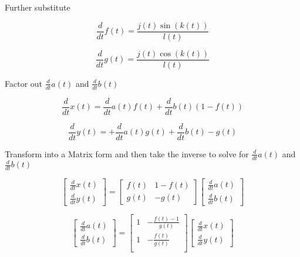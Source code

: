 \documentclass{article}
\begin{document}
Further substitute

\[
    \frac{d}{d t} f{(t )} = \frac{j(t) \sin({k(t)})}{l(t)}
\]

\[
    \frac{d}{d t} g{(t )} = \frac{j(t) \cos({k(t)})}{l(t)}
\]

Factor out $ \frac{d}{d t} a{(t )} $ and $ \frac{d}{d t} b{(t )} $

\[
    \frac{d}{d t} x{(t )} =  \frac{d}{d t} a{(t )} f(t) + \frac{d}{d t} b{(t )} ( 1 - f(t))
\]

\[
    \frac{d}{d t} y{(t )} =  + \frac{d}{d t} a{(t )} g(t) + \frac{d}{d t} b{(t )}  - g(t)
\]

Transform into a Matrix form and then take the inverse to solve for $ \frac{d}{d t} a{(t )} $ and $ \frac{d}{d t} b{(t )} $

\[
    \begin{bmatrix}
    \frac{d}{d t} x{(t )} \\ 
    \frac{d}{d t} y{(t )}
    \end{bmatrix}
    =
    \begin{bmatrix}
    f(t) & 1-f(t) \\ 
    g(t) & -g(t)
    \end{bmatrix}
    \begin{bmatrix}
    \frac{d}{d t} a{(t )} \\ 
    \frac{d}{d t} b{(t )}
    \end{bmatrix}
\]



\[
    \begin{bmatrix}
    \frac{d}{d t} a{(t )} \\ 
    \frac{d}{d t} b{(t )}
    \end{bmatrix}
    =
    \begin{bmatrix}
    1 & -\frac{f(t)-1}{g(t)} \\
    1 & -\frac{f(t)}{g(t)} \\
    \end{bmatrix}
    \begin{bmatrix}
    \frac{d}{d t} x{(t )} \\ 
    \frac{d}{d t} y{(t )}
    \end{bmatrix}
\]
\end{document}
